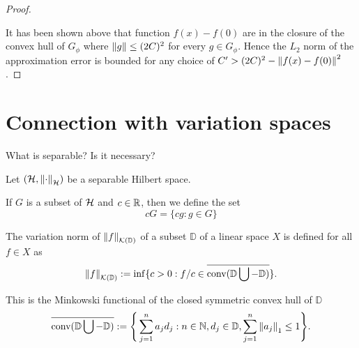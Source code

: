 \begin{proof}
\begin{lemma}
    \end{lemma}


    It has been shown above that function $f(x) - f(0)$ are in the closure of
    the convex hull of $G_{\phi}$ where $\left\| g \right\| \leq (2C)^2$ for every $g \in
    G_{\phi}$. Hence the $L_2$ norm of the approximation error is bounded for
    any choice of $C' > (2C)^2 - \left\| f(x) - f(0) \right\|^2$.




\end{proof}


\section{Connection with variation spaces}

What is separable? Is it necessary?

Let $(\mathcal{H}, \left\| \cdot \right\|_{\mathcal{H}})$ be a separable Hilbert space.

If $G$ is a subset of $\mathcal{H}$ and $c \in \mathbb{R}$, then we define the set
\begin{equation}
    cG = \{cg: g \in G\}
\end{equation}


\begin{definition}
    The variation norm of $\left\| {f} \right\|_{\mathcal{K}({\mathbb{D}})}$ of a subset $\mathbb{D}$ of
    a linear space $X$ is defined for all $f \in X$ as
    \begin{equation}
        \left\| {f} \right\|_{\mathcal{K}({\mathbb{D}})} := \inf \{
            c > 0: f/c \in \overline{\textnormal{conv}(\mathbb{D} \bigcup - \mathbb{D})}
        \}.
    \end{equation}

    This is the Minkowski functional of the closed symmetric convex hull of $\mathbb{D}$
    \begin{equation}
        \overline{\textnormal{conv}(\mathbb{D} \bigcup - \mathbb{D})} := \Bigg\{ 
            \sum_{j=1}^n a_j d_j: n \in \mathbb{N}, d_j \in \mathbb{D}, 
            \sum_{j=1}^n \left\| a_j \right\|_1 \leq 1
        \Bigg\}.
    \end{equation}
\end{definition}


